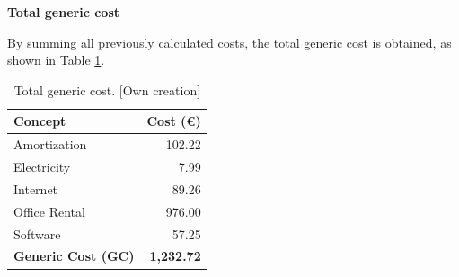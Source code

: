 \textbf{Total generic cost}
\vspace{-5pt}

By summing all previously calculated costs, the total generic cost is obtained, as shown in Table \ref{tab:total-generic-cost}. 

\vspace{-10pt}

\begin{table}[H]
    \renewcommand{\arraystretch}{1}
    \centering
    \footnotesize
    \begin{tabular}{@{}l r@{}}
    \textbf{Concept} & \textbf{Cost (€)} \\ \hline
    Amortization & 102.22  \\
    Electricity & 7.99 \\
    Internet & 89.26 \\
    Office Rental & 976.00 \\
    Software & 57.25 \\
    \hline
    \textbf{Generic Cost (GC)} & \textbf{1,232.72} \\
    \end{tabular}
    \caption[Total generic cost]{Total generic cost. [Own creation]}
    \label{tab:total-generic-cost}
\end{table}

\vspace{-20pt}


